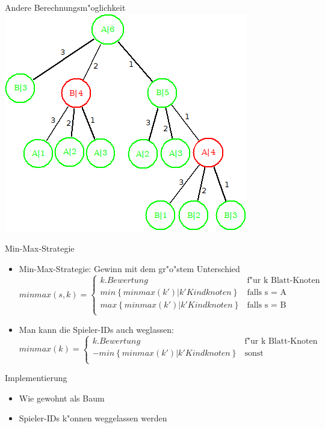 \documentclass[18pt]{beamer}
\begin{document}
\begin{frame}{Andere Berechnungsm"oglichkeit}
\includegraphics[scale=0.4]{baum8.png}
\end{frame}

\begin{frame}{Min-Max-Strategie}
\begin{itemize}
\item Min-Max-Strategie: Gewinn mit dem gr"o"stem Unterschied
\begin{equation}
   minmax(s,k) =
   \begin{cases}
     k.Bewertung & \text{f"ur k Blatt-Knoten} \\
     min\left\{minmax(k') | k' Kindknoten\right\} & \text{falls s = A} \\
     max\left\{minmax(k') | k' Kindknoten\right\} & \text{falls s = B} \\
   \end{cases}
\end{equation}
\item Man kann die Spieler-IDs auch weglassen:
\begin{equation}
   minmax(k) =
   \begin{cases}
     k.Bewertung & \text{f"ur k Blatt-Knoten} \\
     - min\left\{minmax(k') | k' Kindknoten\right\} & \text{sonst} \\
   \end{cases}
\end{equation}
\end{itemize}
\end{frame}

\begin{frame}{Implementierung}
\begin{itemize}
\item Wie gewohnt als Baum

\item Spieler-IDs k"onnen weggelassen werden

\end{itemize}
\end{frame}
\end{document}
